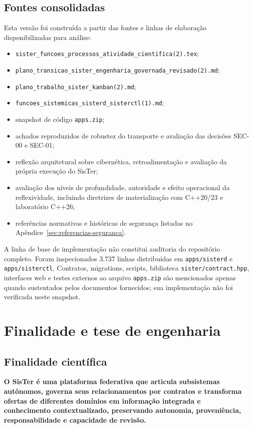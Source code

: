 \documentclass[11pt,a4paper,oneside]{article}
\begin{document}
\subsection*{Fontes consolidadas}
Esta versão foi construída a partir das fontes e linhas de elaboração disponibilizadas para análise:
\begin{itemize}
  \item \texttt{sister\_funcoes\_processos\_atividade\_cientifica(2).tex};
  \item \texttt{plano\_transicao\_sister\_engenharia\_governada\_revisado(2).md};
  \item \texttt{plano\_trabalho\_sister\_kanban(2).md};
  \item \texttt{funcoes\_sistemicas\_sisterd\_sisterctl(1).md};
  \item snapshot de código \texttt{apps.zip};
  \item achados reproduzidos de robustez do transporte e avaliação das decisões SEC-00 e SEC-01;
  \item reflexão arquitetural sobre cibernética, retroalimentação e avaliação da própria execução do SisTer;
  \item avaliação dos níveis de profundidade, autoridade e efeito operacional da reflexividade, incluindo diretrizes de materialização com C++20/23 e laboratório C++26;
  \item referências normativas e históricas de segurança listadas no Apêndice~\ref{sec:referencias-seguranca}.
\end{itemize}

\begin{alerta}
A linha de base de implementação não constitui auditoria do repositório completo. Foram inspecionados 3.737 linhas distribuídas em \texttt{apps/sisterd} e \texttt{apps/sisterctl}. Contratos, migrations, scripts, biblioteca \texttt{sister/contract.hpp}, interfaces web e testes externos ao arquivo \texttt{apps.zip} são mencionados apenas quando sustentados pelos documentos fornecidos; sua implementação não foi verificada neste snapshot.
\end{alerta}

\tableofcontents
\clearpage
{}

\section{Finalidade e tese de engenharia}

\subsection{Finalidade científica}
\begin{principio}
\textbf{O SisTer é uma plataforma federativa que articula subsistemas autônomos, governa seus relacionamentos por contratos e transforma ofertas de diferentes domínios em informação integrada e conhecimento contextualizado, preservando autonomia, proveniência, responsabilidade e capacidade de revisão.}
\end{principio}
\end{document}
